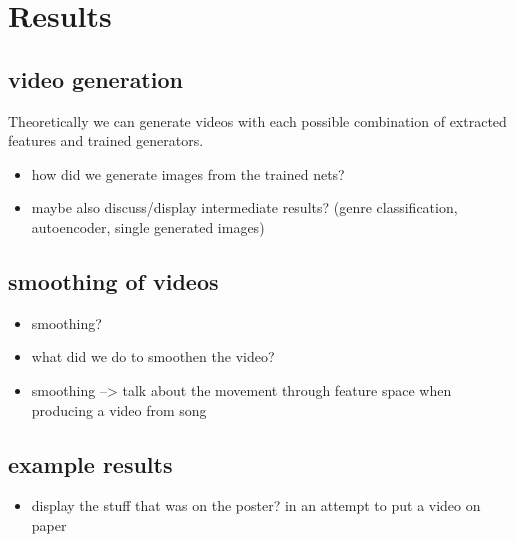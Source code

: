 \chapter{Results}\label{ch:results}

    \section{video generation}
        
        Theoretically we can generate videos with each possible combination of extracted features and trained generators.

        \begin{itemize}
            \item how did we generate images from the trained nets?
            \item maybe also discuss/display intermediate results? (genre classification, autoencoder, single generated images)
        \end{itemize}

    \section{smoothing of videos}
        
        \begin{itemize}
            \item smoothing?
            \item what did we do to smoothen the video?
            \item smoothing --> talk about the movement through feature space when producing a video from song
        \end{itemize}

    \section{example results}

        \begin{itemize}
            \item display the stuff that was on the poster? in an attempt to put a video on paper
        \end{itemize}
